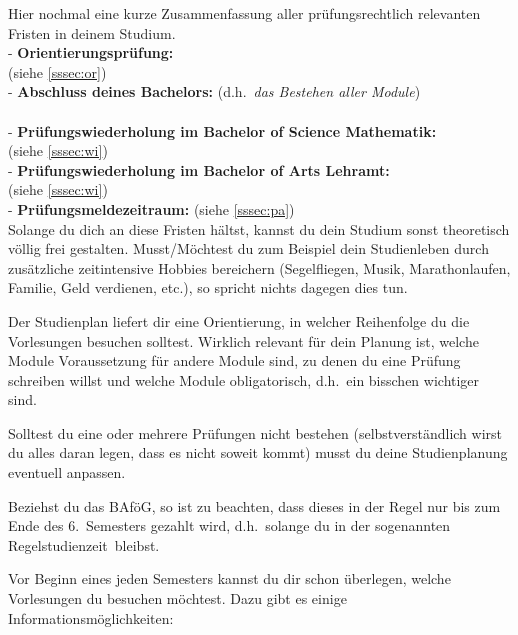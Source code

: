 Hier nochmal eine kurze Zusammenfassung
aller prüfungsrechtlich relevanten Fristen
in deinem Studium.\\[6pt]
- {\bf Orientierungsprüfung:}\\
\hspace{1cm}{\it Bis spätestens zum Beginn des 4.~Semesters} (siehe \ref{sssec:or})\\[3pt]
- {\bf Abschluss deines Bachelors:} (d.h.\ {\it das Bestehen aller Module})\\
\hspace{1cm}{\it Bis spätestens zum Ende des 10.~Semesters}\\[3pt]
- {\bf Prüfungswiederholung im Bachelor of Science Mathematik:}\\
\hspace{1cm}{\it Spätestens beim übernächsten möglichen Termin}
(siehe \ref{sssec:wi})\\[3pt]
- {\bf Prüfungswiederholung im Bachelor of Arts Lehramt:}\\
\hspace{1cm}{\it Spätestens innerhalb von zwei Semestern}
(siehe \ref{sssec:wi})\\[3pt]
- {\bf Prüfungsmeldezeitraum:} (siehe \ref{sssec:pa})\\[6pt]
Solange du dich an diese Fristen hältst,
kannst du dein Studium sonst theoretisch völlig frei gestalten.
Musst/Möchtest du zum Beispiel dein Studienleben
durch zusätzliche zeitintensive Hobbies bereichern
(Segelfliegen, Musik, Marathonlaufen, Familie, Geld verdienen, etc.),
so spricht nichts dagegen dies tun.

\newpage
Der Studienplan liefert dir eine Orientierung,
in welcher Reihenfolge du die Vorlesungen besuchen solltest.
Wirklich relevant für dein Planung ist,
welche Module Voraussetzung für andere Module sind,
zu denen du eine Prüfung schreiben willst
und welche Module obligatorisch,
d.h.\ ein bisschen wichtiger sind.

Solltest du eine oder mehrere Prüfungen nicht bestehen
(selbstverständlich wirst du alles daran legen,
dass es nicht soweit kommt)
musst du deine Studienplanung eventuell anpassen.

Beziehst du das BAföG, so ist zu beachten,
dass dieses in der Regel nur bis zum Ende
des 6.~Semesters gezahlt wird,
d.h.\ solange du in der sogenannten
\glqq Regelstudienzeit\grqq\ bleibst.

Vor Beginn eines jeden Semesters kannst du dir schon überlegen,
welche Vorlesungen du besuchen möchtest.
Dazu gibt es einige Informationsmöglichkeiten:

